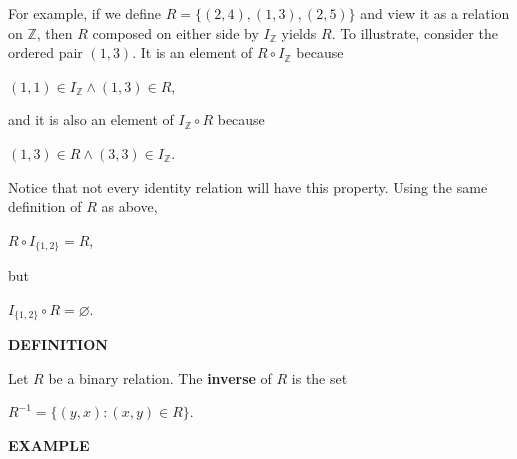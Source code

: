 \documentclass[12pt, a4paper]{article}
\begin{document}
\begin{flushleft}

For example, if we define $R=\{(2,4),(1,3),(2,5)\}$ and view it as a relation on $\mathbb{Z}$, then $R$ composed on either side by $I_{\mathbb{Z}}$ yields $R$. To illustrate, consider the ordered pair $(1,3)$. It is an element of $R\circ I_{\mathbb{Z}}$ because\par

\vspace{4mm}

\centerline{$(1,1)\in I_{\mathbb{Z}}\wedge(1,3)\in R$,}

\vspace{4mm}

and it is also an element of $I_{\mathbb{Z}}\circ R$ because\par

\vspace{4mm}

\centerline{$(1,3)\in R\wedge(3,3)\in I_{\mathbb{Z}}$.}

\vspace{4mm}

Notice that not every identity relation will have this property. Using the same definition of $R$ as above,\par

\vspace{4mm}

\centerline{$R\circ I_{\{1,2\}}=R$,}

\vspace{4mm}

but\par

\vspace{4mm}

\centerline{$I_{\{1,2\}}\circ R=\varnothing$.}

\end{flushleft}

\begin{flushleft}

\blacksquare \textbf{ DEFINITION}

\end{flushleft}

Let $R$ be a binary relation. The \textbf{inverse} of $R$ is the set\par

\vspace{4mm}

\centerline{$R^{-1}=\{(y,x)\colon(x,y)\in R\}$.}

\begin{flushleft}

\blacksquare \textbf{ EXAMPLE}

\end{flushleft}
\end{document}
